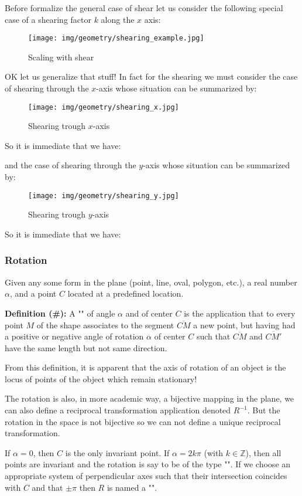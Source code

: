 	Before formalize the general case of shear let us consider the following special case of a shearing factor $k$ along the $x$ axis:
	
	\begin{figure}[H]
		\centering
		\texttt{[image: img/geometry/shearing\_example.jpg]}
		\caption{Scaling with shear}
	\end{figure}
	OK let us generalize that stuff! In fact for the shearing we must consider the case of shearing through the $x$-axis whose situation can be summarized by:
	\begin{figure}[H]
		\centering
		\texttt{[image: img/geometry/shearing\_x.jpg]}
		\caption{Shearing trough $x$-axis}
	\end{figure}
	So it is immediate that we have:
	
	and the case of shearing through the $y$-axis whose situation can be summarized by:
	\begin{figure}[H]
		\centering
		\texttt{[image: img/geometry/shearing\_y.jpg]}
		\caption{Shearing trough $y$-axis}
	\end{figure}
	So it is immediate that we have:
	
	
	\pagebreak
	\subsubsection{Rotation}
	Given any some form in the plane (point, line, oval, polygon, etc.), a real number $\alpha$, and a point $C$ located at a predefined location.

	\textbf{Definition (\#\mydef):} A "" of angle $\alpha$ and of center $C$ is the application that to every point $M$ of the shape associates to the segment $\overline{CM}$ a new point, but having had a positive or negative angle of rotation $\alpha$ of center $C$ such that $\overline{CM}$ and $\overline{CM'}$ have the same length but not same direction.
	
	From this definition, it is apparent that the axis of rotation of an object is the locus of points of the object which remain stationary!
	\begin{tcolorbox}[title=Remark,colframe=black,arc=10pt]
	The rotation is also, in more academic way, a bijective mapping in the plane, we can also define a reciprocal transformation application denoted $R^{-1}$. But the rotation in the space is not bijective so we can not define a unique reciprocal transformation.
	\end{tcolorbox}
	If $\alpha=0$, then $C$ is the only invariant point. If $\alpha=2k\pi$ (with $k\in\mathbb{Z}$), then all points are invariant and the rotation is say to be of the type "". If we choose an appropriate system of perpendicular axes such that their intersection coincides with $C$ and that $\pm \pi$ then $R$ is named a "".

